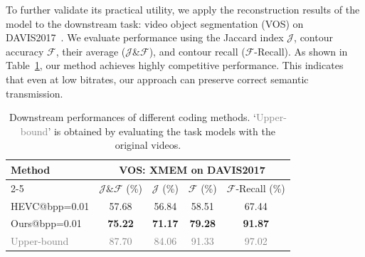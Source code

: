 \documentclass{fairmeta}
\begin{document}
To further validate its practical utility, we apply the reconstruction results of the model to the downstream task: video object segmentation (VOS) on DAVIS2017~\citep{Pont_Tuset_2017_DAVIS}. We evaluate performance using the Jaccard index $\mathcal{J}$, contour accuracy $\mathcal{F}$, their average ($\mathcal{J}$\&$\mathcal{F}$), and contour recall ($\mathcal{F}$-Recall). As shown in Table~\ref{tab:downstream}, our method achieves highly competitive performance. This indicates that even at low bitrates, our approach can preserve correct semantic transmission.

\begin{table}[h]
    \centering
    \caption{Downstream performances of different coding methods. ‘\textcolor{gray}{Upper-bound}’ is obtained by evaluating the task models with the original videos. \label{tab:downstream}}
    \begin{tabular}{lcccc}
    \toprule
    \multirow{2}{*}{Method}  & \multicolumn{4}{c}{\textbf{VOS: XMEM on DAVIS2017}} \\
  \cmidrule(lr){2-5} & $\mathcal{J}\&\mathcal{F}$ (\%) & $\mathcal{J}$ (\%) & $\mathcal{F}$ (\%) & $\mathcal{F}$-Recall (\%) \\
\midrule

    HEVC@bpp=0.01  & 57.68 & 56.84 & 58.51 & 67.44 \\
    Ours@bpp=0.01 & \textbf{75.22} & \textbf{71.17} & \textbf{79.28} & \textbf{91.87} \\
    \hdashline 
    \rule{0pt}{2.5ex} \textcolor{gray}{Upper-bound}  & \textcolor{gray}{87.70} & \textcolor{gray}{84.06} & \textcolor{gray}{91.33} & \textcolor{gray}{97.02} \\
    \bottomrule
    \end{tabular}
\end{table}



\end{document}
